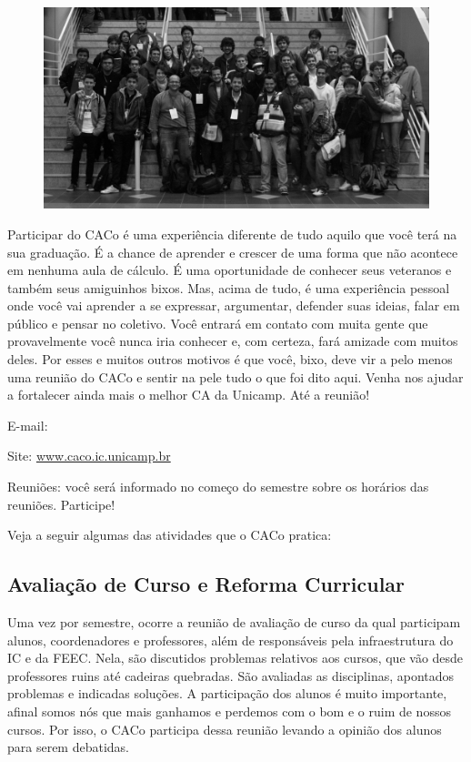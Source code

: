 \begin{figure}[H]
    \centering
    \includegraphics[scale=0.21]{img/alem_da_graduacao/caco_fisl2.jpg}
\end{figure}

Participar do CACo é uma experiência diferente de tudo aquilo que você terá na
sua graduação. É a chance de aprender e crescer de uma forma que não acontece em
nenhuma aula de cálculo. É uma oportunidade de conhecer seus veteranos e também
seus amiguinhos bixos. Mas, acima de tudo, é uma experiência pessoal onde você
vai aprender a se expressar, argumentar, defender suas ideias, falar em público
e pensar no coletivo. Você entrará em contato com muita gente que provavelmente
você nunca iria conhecer e, com certeza, fará amizade com muitos deles. Por
esses e muitos outros motivos é que você, bixo, deve vir a pelo menos uma
reunião do CACo e sentir na pele tudo o que foi dito aqui. Venha nos ajudar a
fortalecer ainda mais o melhor CA da Unicamp. Até a reunião!

\begin{compactitemize}
    \item  E-mail: 
    \item  Site: \url{www.caco.ic.unicamp.br}
    \item  Reuniões: você será informado no começo do semestre sobre os horários
        das reuniões. Participe!
\end{compactitemize}

Veja a seguir algumas das atividades que o CACo pratica:

\subsection{Avaliação de Curso e Reforma Curricular}

Uma vez por semestre, ocorre a reunião de avaliação de curso da qual participam
alunos, coordenadores e professores, além de responsáveis pela infraestrutura do
IC e da FEEC. Nela, são discutidos problemas relativos aos cursos, que vão desde
professores ruins até cadeiras quebradas. São avaliadas as disciplinas,
apontados problemas e indicadas soluções. A participação dos alunos é muito
importante, afinal somos nós que mais ganhamos e perdemos com o bom e o ruim de
nossos cursos. Por isso, o CACo participa dessa reunião levando a opinião dos
alunos para serem debatidas.

